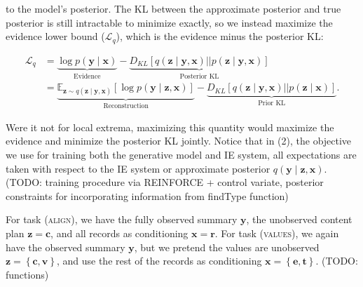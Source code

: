 \documentclass[11pt]{article}
\newcommand\set[1]{\left\{#1\right\}}
\newcommand\Es[2]{\mathbb{E}_{#1}\left[#2\right]}
\newcommand{\bc}{\mathbf{c}}
\newcommand{\be}{\mathbf{e}}
\newcommand{\br}{\mathbf{r}}
\newcommand{\bt}{\mathbf{t}}
\newcommand{\bv}{\mathbf{v}}
\newcommand{\bx}{\mathbf{x}}
\newcommand{\by}{\mathbf{y}}
\newcommand{\bz}{\mathbf{z}}
\begin{document}
to the model's posterior.
The KL between the approximate posterior and true posterior is still intractable to minimize exactly,
so we instead maximize the evidence lower bound ($\mathcal{L}_q$), which is the evidence minus the posterior KL:
\begin{linenomath*}
\begin{align}
\mathcal{L}_q
&= \underbrace{\log p(\by\mid\bx)}_{\textrm{Evidence}}
- \underbrace{D_{KL}[q(\bz\mid\by,\bx)||p(\bz\mid\by,\bx)]}_{\textrm{Posterior KL}}\\
&= \underbrace{\Es{\bz\sim q(\bz\mid\by,\bx)}{\log p(\by\mid\bz,\bx)}}_{\textrm{Reconstruction}}
- \underbrace{D_{KL}[q(\bz\mid\by,\bx) || p(\bz\mid\bx)]}_{\textrm{Prior KL}}.
\end{align}
\end{linenomath*}
Were it not for local extrema,
maximizing this quantity would maximize the evidence and minimize the posterior KL jointly.
Notice that in (2), the objective we use for training both the generative model and IE system,
all expectations are taken with respect to the IE system or approximate posterior $q(\by\mid\bz,\bx)$.
(TODO: training procedure via REINFORCE + control variate, posterior constraints for incorporating 
information from findType function)

For task (\textsc{align}), we have the fully observed summary $\by$,
the unobserved content plan $\bz=\bc$, and all records as conditioning $\bx=\br$.
For task (\textsc{values}), we again have the observed summary $\by$,
but we pretend the values are unobserved $\bz=\set{\bc,\bv}$, and
use the rest of the records as conditioning $\bx=\set{\be,\bt}$.
(TODO: functions)




\end{document}
